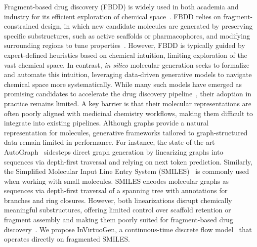 \documentclass{article} %
\begin{document}
Fragment-based drug discovery (FBDD) is widely used in both academia and industry for its efficient exploration of chemical space~\citep{kirkman}. FBDD relies on fragment-constrained design, in which new candidate molecules are generated by preserving specific substructures, such as active scaffolds or pharmacophores, and modifying surrounding regions to tune properties~\citep{molecules24234309}. However, FBDD is typically guided by expert-defined heuristics based on chemical intuition, limiting exploration of the vast chemical space.
In contrast, \textit{in silico} molecular generation seeks to formalize and automate this intuition, leveraging data-driven generative models to navigate chemical space more systematically. While many such models have emerged as promising candidates to accelerate the drug discovery pipeline~\citep{ZENG2022100794}, their adoption in practice remains limited. A key barrier is that their molecular representations are often poorly aligned with medicinal chemistry workflows, making them difficult to integrate into existing pipelines.
Although graphs provide a natural representation for molecules, generative frameworks tailored to graph-structured data remain limited in performance. For instance, the state-of-the-art AutoGraph~\citep{chen2025flattengraphssequencestransformers} sidesteps direct graph generation by linearizing graphs into sequences via depth-first traversal and relying on next token prediction. Similarly, the Simplified Molecular Input Line Entry System (SMILES)~\citep{smiles} is commonly used when working with small molecules. SMILES encodes molecular graphs as sequences via depth-first traversal of a spanning tree with annotations for branches and ring closures. However, both linearizations disrupt chemically meaningful substructures, offering limited control over scaffold retention or fragment assembly and making them poorly suited for fragment-based drug discovery~\citep{fbdd_smiles}. We propose InVirtuoGen, a continuous-time discrete flow model~\citep{campbell2024generativeflowsdiscretestatespaces,gat2024discrete_flow_matching} that operates directly on fragmented SMILES.
\end{document}
